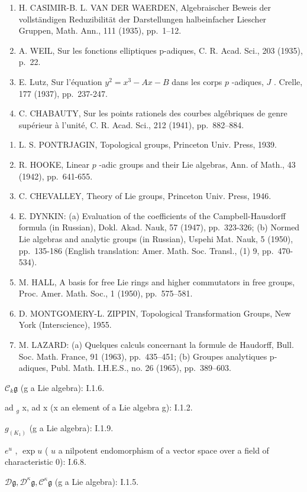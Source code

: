 \begin{enumerate}
\item
  H. CASIMIR-B. L. VAN DER WAERDEN, Algebraischer Beweis der vollständigen Reduzibilität der Darstellungen halbeinfacher Liescher Gruppen, Math. Ann., 111 (1935), pp.~1--12.
\item
  A. WEIL, Sur les fonctions elliptiques p-adiques, C. R. Acad. Sci., 203 (1935), p.~22.
\item
  E. Lutz, Sur l'équation \(y^{2} = x^{3} - Ax - B\) dans les corps \(p\) -adiques, \(J\) . Crelle, 177 (1937), pp.~237-247.
\item
  C. CHABAUTY, Sur les points rationels des courbes algébriques de genre supérieur à l'unité, C. R. Acad. Sci., 212 (1941), pp.~882--884.
\end{enumerate}

\begin{enumerate}
\def\labelenumi{\arabic{enumi}.}
\setcounter{enumi}{35}
\item
  L. S. PONTRJAGIN, Topological groups, Princeton Univ. Press, 1939.
\item
  R. HOOKE, Linear \(p\) -adic groups and their Lie algebras, Ann. of Math., 43 (1942), pp.~641-655.
\item
  C. CHEVALLEY, Theory of Lie groups, Princeton Univ. Press, 1946.
\item
  E. DYNKIN: (a) Evaluation of the coefficients of the Campbell-Hausdorff formula (in Russian), Dokl. Akad. Nauk, 57 (1947), pp.~323-326; (b) Normed Lie algebras and analytic groups (in Russian), Uspehi Mat. Nauk, 5 (1950), pp.~135-186 (English translation: Amer. Math. Soc. Transl., (1) 9, pp.~470-534).
\item
  M. HALL, A basis for free Lie rings and higher commutators in free groups, Proc. Amer. Math. Soc., 1 (1950), pp.~575--581.
\item
  D. MONTGOMERY-L. ZIPPIN, Topological Transformation Groups, New York (Interscience), 1955.
\item
  M. LAZARD: (a) Quelques calculs concernant la formule de Haudorff, Bull. Soc. Math. France, 91 (1963), pp.~435--451; (b) Groupes analytiques p-adiques, Publ. Math. I.H.E.S., no. 26 (1965), pp.~389--603.
\end{enumerate}

\(\mathcal{C}_k\mathfrak{g}\) (g a Lie algebra): I.1.6.

ad \(_{g}\) x, ad x (x an element of a Lie algebra g): I.1.2.

\(g_{(K_{1})}\) (g a Lie algebra): I.1.9.

\(e^u\) , \(\exp u\) ( \(u\) a nilpotent endomorphism of a vector space over a field of characteristic 0): I.6.8.

\(\mathcal{D}\mathfrak{g}, \mathcal{D}^{\kappa}\mathfrak{g}, \mathcal{C}^{\kappa}\mathfrak{g}\) (g a Lie algebra): I.1.5.
\relax{}
